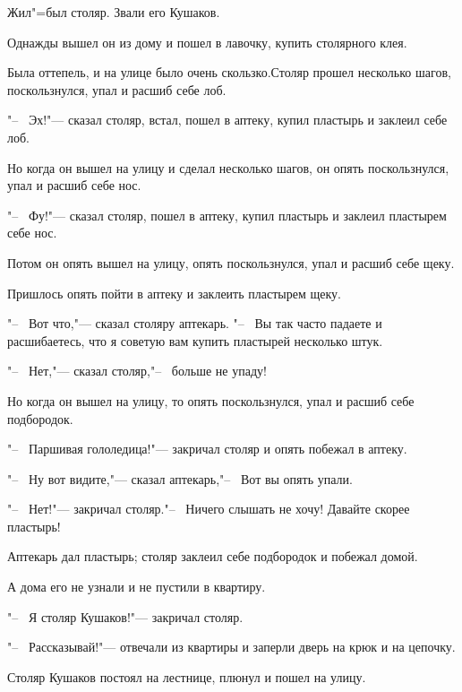 Жил"=был столяр. Звали его  Кушаков.

Однажды  вышел  он из дому и пошел в лавочку, купить столярного клея.

Была  оттепель,  и  на  улице было очень скользко.Столяр прошел несколько шагов, поскользнулся, упал и расшиб себе лоб.

"--~ Эх!"--- сказал  столяр,  встал,  пошел в аптеку, купил пластырь и заклеил себе лоб.
    
Но когда он вышел на улицу и сделал  несколько шагов,  он опять поскользнулся, упал и расшиб себе нос.

"--~ Фу!"--- сказал столяр, пошел в  аптеку, купил пластырь и заклеил пластырем себе нос.

Потом он опять  вышел  на  улицу,  опять поскользнулся, упал и расшиб себе щеку.

Пришлось опять пойти в аптеку и заклеить пластырем щеку.

"--~ Вот что,"---  сказал столяру аптекарь. "--~ Вы так часто  падаете и расшибаетесь, что я советую вам купить пластырей несколько штук.

"--~ Нет,"--- сказал столяр,"--~ больше не упаду!

Но когда он вышел на улицу, то опять поскользнулся, упал и расшиб себе подбородок.

"--~ Паршивая гололедица!"---  закричал столяр и опять побежал в аптеку.

"--~ Ну вот видите,"---  сказал аптекарь,"--~ Вот вы опять упали.

"--~ Нет!"--- закричал столяр."--~  Ничего слышать не хочу! Давайте скорее пластырь!

Аптекарь  дал пластырь;  столяр  заклеил себе подбородок и побежал домой.

А дома его не узнали и не пустили в квартиру.

"--~ Я столяр Кушаков!"--- закричал столяр.
    
"--~ Рассказывай!"---  отвечали из квартиры и заперли дверь на крюк и на цепочку.

Столяр Кушаков постоял на лестнице, плюнул и пошел на улицу.